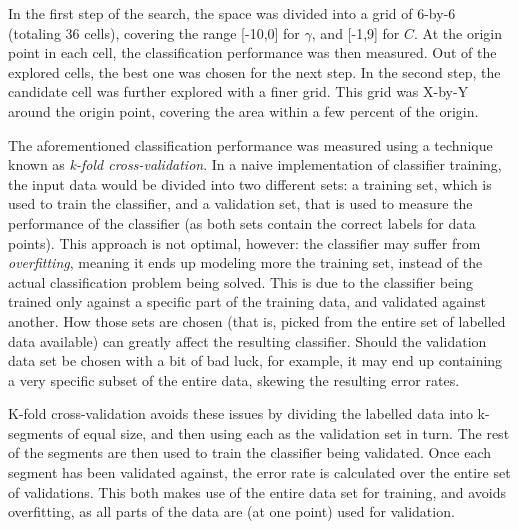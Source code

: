 \documentclass{netsec2012}
\begin{document}
In the first step of the search, the space was divided into a grid of 6-by-6 (totaling 36 cells),
covering the range [-10,0] for $\gamma$, and [-1,9] for $C$.  At the origin point in each cell, the
classification performance was then measured.  Out of the explored cells, the best one was chosen
for the next step.  In the second step, the candidate cell was further explored with a finer grid.
This grid was X-by-Y around the origin point, covering the area within a few percent of the origin.

\label{ref:crossvalidation}

The aforementioned classification performance was measured using a technique known as \emph{k-fold
cross-validation}.  In a naive implementation of classifier training, the input data would be
divided into two different sets: a training set, which is used to train the classifier, and a
validation set, that is used to measure the performance of the classifier (as both sets contain the
correct labels for data points).  This approach is not optimal, however: the classifier may suffer
from \emph{overfitting}, meaning it ends up modeling more the training set, instead of the actual
classification problem being solved.  This is due to the classifier being trained only against a
specific part of the training data, and validated against another.  How those sets are chosen (that
is, picked from the entire set of labelled data available) can greatly affect the resulting
classifier.  Should the validation data set be chosen with a bit of bad luck, for example, it may
end up containing a very specific subset of the entire data, skewing the resulting error rates.

K-fold cross-validation avoids these issues by dividing the labelled data into k-segments of equal
size, and then using each as the validation set in turn.  The rest of the segments are then used to
train the classifier being validated.  Once each segment has been validated against, the error rate
is calculated over the entire set of validations.  This both makes use of the entire data set for
training, and avoids overfitting, as all parts of the data are (at one point) used for validation.

\end{document}
